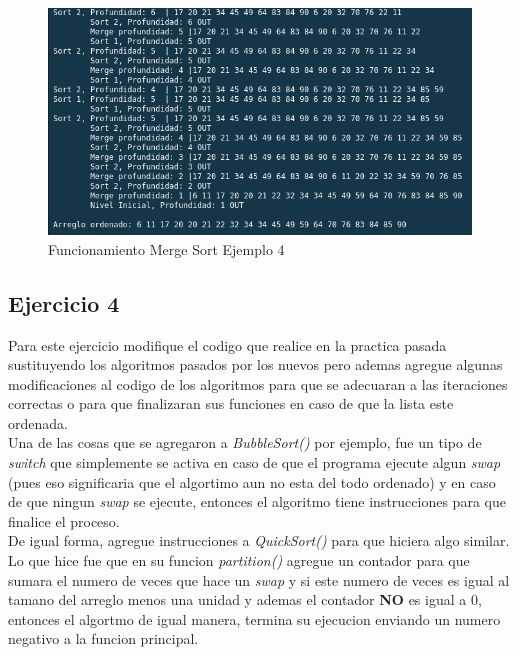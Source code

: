 \documentclass{article}
\begin{document}
		\begin{figure}[H]
			\centering
			\includegraphics[scale = 0.7]{images/e3m4.png}
			\caption{Funcionamiento Merge Sort Ejemplo 4}
		\end{figure}
	\newpage
				
		\subsection{Ejercicio 4}
		
		Para este ejercicio modifique el codigo que realice en la practica pasada sustituyendo los algoritmos pasados por los nuevos pero ademas agregue algunas modificaciones al codigo de los algoritmos para que se adecuaran a las iteraciones correctas o para que finalizaran sus funciones en caso de que la lista este ordenada.\\
		
		Una de las cosas que se agregaron a \emph{BubbleSort()} por ejemplo, fue un tipo de \emph{switch} que simplemente se activa en caso de que el programa ejecute algun \emph{swap} (pues eso significaria que el algortimo aun no esta del todo ordenado) y en caso de que ningun \emph{swap} se ejecute, entonces el algoritmo tiene instrucciones para que finalice el proceso.\\
		
		De igual forma, agregue instrucciones a \emph{QuickSort()} para que hiciera algo similar. Lo que hice fue que en su funcion \emph{partition()} agregue un contador para que sumara el numero de veces que hace un \emph{swap} y si este numero de veces es igual al tamano del arreglo menos una unidad y ademas el contador \textbf{NO} es igual a 0, entonces el algortmo de igual manera, termina su ejecucion enviando un numero negativo a la funcion principal.\\
		
\end{document}
